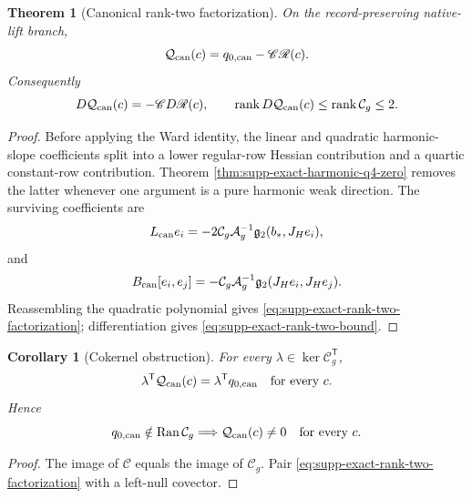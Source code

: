 \documentclass[11pt]{article}
\newtheorem{theorem}{Theorem}[section]
\numberwithin{equation}{section}
\newtheorem{corollary}[corollary]{Corollary}
\theoremstyle{definition}
\theoremstyle{remark}
\newcommand{\rank}{\operatorname{rank}}
\newcommand{\Ran}{\operatorname{Ran}}
\begin{document}
\begin{theorem}[Canonical rank-two factorization]
\label{thm:supp-exact-rank-two-factorization}
On the record-preserving native-lift branch,
\begin{equation}
 \mathcal Q_{\rm can}(c)
 =q_{0,\rm can}-\mathscr C\mathscr R(c).
 \label{eq:supp-exact-rank-two-factorization}
\end{equation}
Consequently
\begin{equation}
 D\mathcal Q_{\rm can}(c)
 =-\mathscr C D\mathscr R(c),
 \qquad
 \rank D\mathcal Q_{\rm can}(c)
 \le\rank\mathcal C_g\le2.
 \label{eq:supp-exact-rank-two-bound}
\end{equation}
\end{theorem}
\begin{proof}
Before applying the Ward identity, the linear and quadratic harmonic-slope
coefficients split into a lower regular-row Hessian contribution and a
quartic constant-row contribution.  Theorem
\ref{thm:supp-exact-harmonic-q4-zero} removes the latter whenever one
argument is a pure harmonic weak direction.  The surviving coefficients are
\[
 L_{\rm can}e_i
 =-2\mathcal C_g\mathcal A_g^{-1}
     \mathfrak g_2(b_*,J_He_i),
\]
and
\[
 B_{\rm can}[e_i,e_j]
 =-\mathcal C_g\mathcal A_g^{-1}
     \mathfrak g_2(J_He_i,J_He_j).
\]
Reassembling the quadratic polynomial gives
\eqref{eq:supp-exact-rank-two-factorization}; differentiation gives
\eqref{eq:supp-exact-rank-two-bound}.
\end{proof}

\begin{corollary}[Cokernel obstruction]
\label{cor:supp-exact-slope-cokernel}
For every $\lambda\in\ker\mathcal C_g^{\mathsf T}$,
\begin{equation}
 \lambda^{\mathsf T}\mathcal Q_{\rm can}(c)
 =\lambda^{\mathsf T}q_{0,\rm can}\quad\text{for every }c.
 \label{eq:supp-exact-cokernel-constant}
\end{equation}
Hence
\begin{equation}
 q_{0,\rm can}\notin\Ran\mathcal C_g
 \Longrightarrow
 \mathcal Q_{\rm can}(c)\ne0\quad\text{for every }c.
 \label{eq:supp-exact-cokernel-no-root}
\end{equation}
\end{corollary}
\begin{proof}
The image of $\mathscr C$ equals the image of $\mathcal C_g$.  Pair
\eqref{eq:supp-exact-rank-two-factorization} with a left-null covector.
\end{proof}
\end{document}
